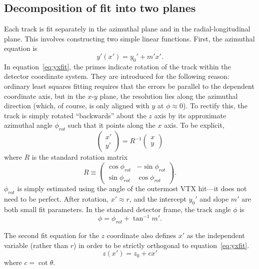 \documentclass[12pt]{article}
\begin{document}
\subsection{Decomposition of fit into two planes} \label{sec:fitdecomp}
Each track is fit separately in the azimuthal plane and in the radial-longitudinal plane. This involves constructing two simple linear functions. First, the azimuthal equation is
\begin{equation} \label{eq:yxfit}
y'(x') = y_0' + m' x'.
\end{equation}
In equation~\ref{eq:yxfit}, the primes indicate rotation of the track within the detector coordinate system. They are introduced for the following reason: ordinary least squares fitting requires that the errors be parallel to the dependent coordinate axis, but in the $x$-$y$ plane, the resolution lies along the azimuthal direction (which, of course, is only aligned with $y$ at $\phi \approx 0$). To rectify this, the track is simply rotated ``backwards'' about the $z$ axis by its approximate azimuthal angle $\phi_{rot}$ such that it points along the $x$ axis. To be explicit,
\begin{equation} \label{eq:phirot}
\begin{pmatrix}
x'\\
y'
\end{pmatrix}
= R^{-1}
\begin{pmatrix}
x\\
y
\end{pmatrix}
\end{equation}
where $R$ is the standard rotation matrix
\begin{equation} \label{eq:R}
R \equiv
\begin{pmatrix}
\cos \phi_{rot} & -\sin \phi_{rot}\\
\sin \phi_{rot} &  \cos \phi_{rot}
\end{pmatrix}.
\end{equation}
$\phi_{rot}$ is simply estimated using the angle of the outermost VTX hit---it does not need to be perfect. After rotation, $x' \approx r$, and the intercept $y_0'$ and slope $m'$ are both small fit parameters. In the standard detector frame, the track angle $\phi$ is
\begin{equation}
\phi = \phi_{rot} + \tan^{-1} m'.
\end{equation}

The second fit equation for the $z$ coordinate also defines $x'$ as the independent variable (rather than $r$) in order to be strictly orthogonal to equation~\ref{eq:yxfit}.
\begin{equation} \label{eq:zrfit}
z(x') = z_0 + c x'
\end{equation}
where $c = \cot \theta$.
\end{document}
